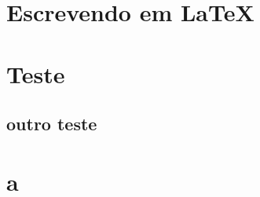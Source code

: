 \section{Escrevendo em \LaTeX}

\lipsum

\section{Teste}

\lipsum

\subsection{outro teste}

\lipsum

\section{a}